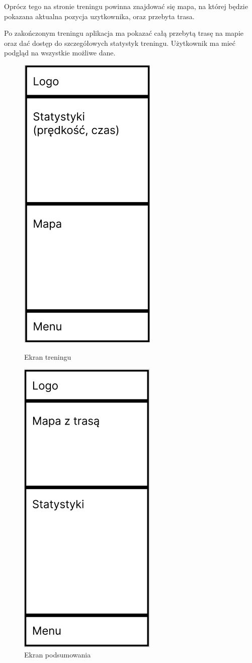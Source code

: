 \hspace{0.60cm}Oprócz tego na stronie treningu powinna znajdować się mapa, na której będzie pokazana aktualna pozycja uzytkownika, oraz przebyta trasa.

\hspace{0.60cm}Po zakończonym treningu aplikacja ma pokazać całą przebytą trasę na mapie oraz dać dostęp do szczegółowych statystyk treningu. Użytkownik ma mieć podgląd na wszystkie możliwe dane.

\begin{figure}[!htb]
	\centering
	\begin{minipage}{.5\textwidth}
		\centering
		\includegraphics[width=.4\linewidth]{rys/ekran_treningu.png}
		\caption{Ekran treningu}
		\label{rys:rysunek001}
	\end{minipage}%
	\begin{minipage}{.5\textwidth}
		\centering
		\includegraphics[width=.4\linewidth]{rys/ekran_podsumowania.png}
		\caption{Ekran podsumowania}
		\label{rys:rysunek002}
	\end{minipage}
\end{figure}

